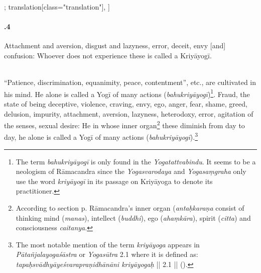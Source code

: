 \begin{alignment}[
  texts=edition[class="edition"];
  translation[class="translation"],
  ]
\begin{translation}
\begin{tlate}[02_4]
    \paragraph{.4} Attachment and aversion, disgust and lazyness, error, deceit, envy [and] confusion: Whoever does not experience these is called a Kriyāyogī.
    \\\\
  \end{tlate}
  \begin{tlate}[p02_02]
``Patience, discrimination, equanimity, peace, contentment'', etc., are cultivated in his mind. He alone is called a Yogī of many actions (\textit{bahukriyāyogī})\footnote{The term \textit{bahukriyāyogī} is only found in the \textit{Yogatattvabindu}. It seems to be a neologism of Rāmacandra since the \textit{Yogasvarodaya} and \textit{Yogasaṃgraha} only use the word \textit{kriyāyogī} in its passage on Kriyāyoga to denote its practitioner.}. Fraud, the state of being deceptive, violence, craving, envy, ego, anger, fear, shame, greed, delusion, impurity, attachment, aversion, lazyness, heterodoxy, error, agitation of the senses, sexual desire: He in whose inner organ\footnote{According to section  p.\pageref{greatelements2} Rāmacandra's inner organ (\textit{antaḥkaraṇa} consist of thinking mind (\textit{manas}), intellect (\textit{buddhi}), ego (\textit{ahaṃkāra}), spirit (\textit{citta}) and consciousness \textit{caitanya}.} these diminish from day to day, he alone is called a Yogī of many actions (\textit{bahukriyāyogī}).\footnote{The most notable mention of the term \textit{kriyāyoga} appears in \textit{Pātañjalayogaśāstra} or \textit{Yogasūtra} 2.1 where it is defined as: \textit{tapaḥsvādhyāyeśvarapraṇidhānāni kriyāyogaḥ} || 2.1 || (\citeauthor[1983:113]{yogasutra}).
}
\end{tlate}
\end{translation}
\end{alignment}
